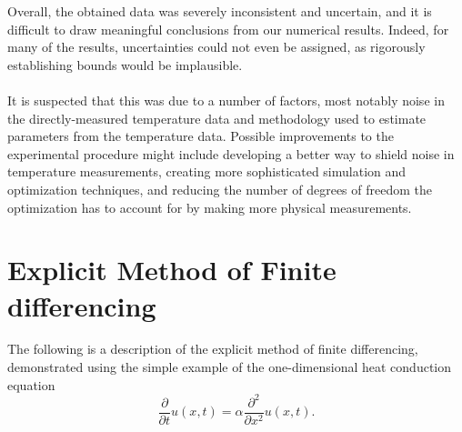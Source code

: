 \documentclass[letterpaper,titlepage,oneside]{report}
\begin{document}
Overall, the obtained data was severely inconsistent and uncertain,
and it is difficult to draw meaningful conclusions from our
numerical results. Indeed, for many of the results, uncertainties
could not even be assigned,
as rigorously establishing bounds would be implausible.
\\\\
It is suspected that this was due to a number of factors, most
notably noise in the directly-measured temperature data and
methodology used to estimate parameters from the temperature data.
Possible improvements to the experimental procedure might include
developing a better way to shield noise in temperature measurements,
creating more sophisticated simulation and optimization techniques,
and reducing the number of degrees of freedom the optimization has to
account for by making more physical measurements.

\appendix

\chapter{Explicit Method of Finite differencing}
\label{ch:finitediff}
The following is a description of the explicit method of
finite differencing, demonstrated
using the simple example of the one-dimensional heat conduction equation
\begin{equation}\label{eq:condsimp}
  \frac{\partial}{\partial t}u(x,t) = \alpha\frac{\partial^2}{\partial x^2}u(x,t).
\end{equation}
\end{document}

